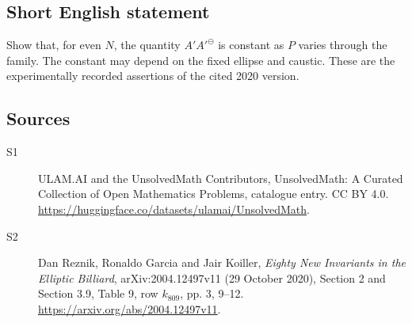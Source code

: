 \documentclass[11pt]{article}
\begin{document}
\subsection{Short English statement}
Show that, for even $N$, the quantity $A'{A'}^\ominus$ is constant as $P$ varies through the family. The constant may depend on the fixed ellipse and caustic. These are the experimentally recorded assertions of the cited 2020 version.
\subsection{Sources}
\begin{description}
\item[\hypertarget{source:statement:1}{S1}] ULAM.AI and the UnsolvedMath Contributors, UnsolvedMath: A Curated Collection of Open Mathematics Problems, catalogue entry. CC BY 4.0. \url{https://huggingface.co/datasets/ulamai/UnsolvedMath}.
\item[\hypertarget{source:statement:2}{S2}] Dan Reznik, Ronaldo Garcia and Jair Koiller, \emph{Eighty New Invariants in the Elliptic Billiard}, arXiv:2004.12497v11 (29 October 2020), Section 2 and Section 3.9, Table 9, row $k_{809}$, pp. 3, 9--12. \url{https://arxiv.org/abs/2004.12497v11}.
\end{description}
\label{end:statement}
\end{document}

